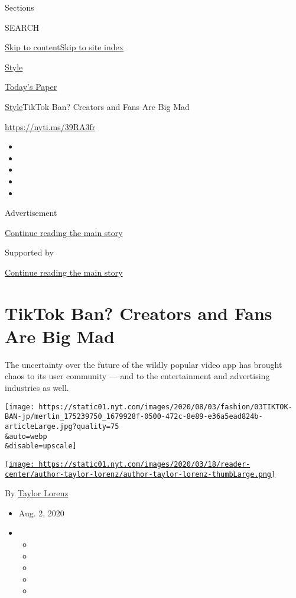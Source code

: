 Sections

SEARCH

\protect\hyperlink{site-content}{Skip to
content}\protect\hyperlink{site-index}{Skip to site index}

\href{https://www.nytimes.com/section/style}{Style}

\href{https://myaccount.nytimes.com/auth/login?response_type=cookie\&client_id=vi}{}

\href{https://www.nytimes.com/section/todayspaper}{Today's Paper}

\href{/section/style}{Style}\textbar{}TikTok Ban? Creators and Fans Are
Big Mad

\url{https://nyti.ms/39RA3fr}

\begin{itemize}
\item
\item
\item
\item
\item
\end{itemize}

Advertisement

\protect\hyperlink{after-top}{Continue reading the main story}

Supported by

\protect\hyperlink{after-sponsor}{Continue reading the main story}

\hypertarget{tiktok-ban-creators-and-fans-are-big-mad}{%
\section{TikTok Ban? Creators and Fans Are Big
Mad}\label{tiktok-ban-creators-and-fans-are-big-mad}}

The uncertainty over the future of the wildly popular video app has
brought chaos to its user community --- and to the entertainment and
advertising industries as well.

\texttt{[image: https://static01.nyt.com/images/2020/08/03/fashion/03TIKTOK-BAN-jp/merlin\_175239750\_1679928f-0500-472c-8e89-e36a5ead824b-articleLarge.jpg?quality=75\\\&auto=webp\\\&disable=upscale]}

\href{https://www.nytimes.com/by/taylor-lorenz}{\texttt{[image: https://static01.nyt.com/images/2020/03/18/reader-center/author-taylor-lorenz/author-taylor-lorenz-thumbLarge.png]}}

By \href{https://www.nytimes.com/by/taylor-lorenz}{Taylor Lorenz}

\begin{itemize}
\item
  Aug. 2, 2020
\item
  \begin{itemize}
  \item
  \item
  \item
  \item
  \item
  \end{itemize}
\end{itemize}

